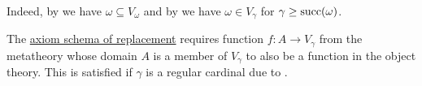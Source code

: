 \begin{remark}
\begin{thmenum}[series=thm:cumulative_hierarchy_model_of_zfc]
    Indeed, by  we have \( \omega \subseteq V_\omega \) and by  we have \( \omega \in V_\gamma \) for \( \gamma \geq \operatorname{succ}(\omega) \).

     The \hyperref[def:zfc/replacement]{axiom schema of replacement} requires function \( f: A \to V_\gamma \) from the metatheory whose domain \( A \) is a member of \( V_\gamma \) to also be a function in the object theory. This is satisfied if \( \gamma \) is a regular cardinal due to .
  \end{thmenum}
\end{remark}
